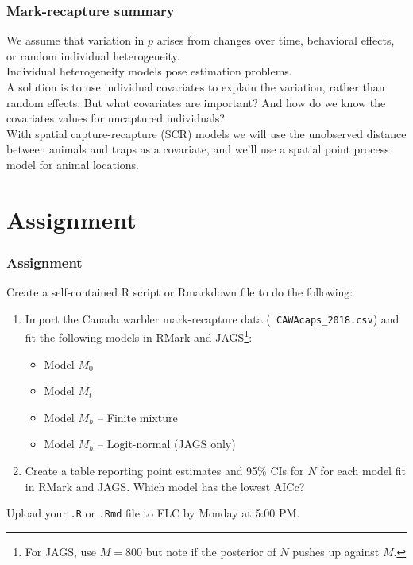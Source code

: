 \documentclass[color=usenames,dvipsnames]{beamer}\usepackage[]{graphicx}\usepackage[]{color}
\begin{document}


\begin{frame}
  \frametitle{Mark-recapture summary}
  We assume that variation in $p$ arises from changes over time,
  behavioral effects, or random individual heterogeneity. \\
  \pause \vfill
  Individual heterogeneity models pose estimation problems. \\
  \pause \vfill
  A solution is to use individual covariates to explain the variation,
  rather than random effects. \pause But what covariates are
  important? And how do we know the covariates values for uncaptured
  individuals? \\
  \pause \vfill
  With spatial capture-recapture (SCR) models we will use
  \alert{the unobserved distance between animals and traps} as a
  covariate, and we'll use a spatial point process model for
  animal locations.  
\end{frame}




\section{Assignment}




\begin{frame}[fragile]
  \frametitle{Assignment}
  \small
  Create a self-contained R script or Rmarkdown file to do the
  following: 
  \vfill
  \begin{enumerate}
    \small
    \item Import the Canada warbler mark-recapture data ({\tt
        CAWAcaps\_2018.csv}) and fit the following models in RMark and
      JAGS\footnote{For JAGS, use $M=800$ but note if the posterior of
      $N$ pushes up against $M$.}:
      \begin{itemize}
        \item Model $M_0$
        \item Model $M_t$ 
        \item Model $M_h$ -- Finite mixture
        \item Model $M_h$ -- Logit-normal (JAGS only)
      \end{itemize}
    \item Create a table reporting point estimates and 95\% CIs for
      $N$ for each model fit in RMark and JAGS. Which model has the
      lowest AICc? 
  \end{enumerate}
  \vfill
  Upload your {\tt .R} or {\tt .Rmd} file to ELC by Monday at 5:00 PM. 
\end{frame}
\end{document}
